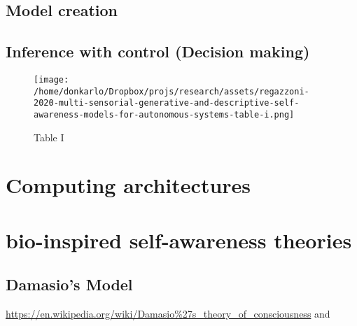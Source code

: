 \documentclass{article}
\begin{document}
			\subsection{Model creation}
			\subsection{Inference with control (Decision making)}
		
		\begin{figure*}
			\centering
			\texttt{[image: /home/donkarlo/Dropbox/projs/research/assets/regazzoni-2020-multi-sensorial-generative-and-descriptive-self-awareness-models-for-autonomous-systems-table-i.png]}
			\caption{Table I}
			\label{fig:regazzoni-2020-multi-sensorial-generative-and-descriptive-self-awareness-models-for-autonomous-systems-table-i.jpg}
		\end{figure*}
	\section{Computing architectures}
		\cite{sanz-2009-systems-models-and-self-awareness-towards-architectural-models-of-consciousness}
	\section{bio-inspired self-awareness theories}
		\subsection{Damasio’s Model} \url{https://en.wikipedia.org/wiki/Damasio\%27s_theory_of_consciousness} and \citet{damasio-1999-the-feeling-of-what-happens-body-and-emotion-in-the-making-of-consciousness}
\end{document}
